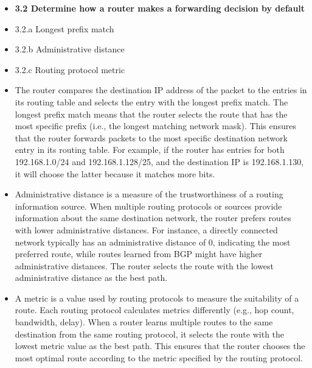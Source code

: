 \documentclass{article}
\begin{document}
\begin{itemize}
  \item \textbf{3.2 Determine how a router makes a forwarding decision by default}
  \item 3.2.a Longest prefix match
  \item 3.2.b Administrative distance
  \item 3.2.c Routing protocol metric
  	\item[] The router compares the destination IP address of the packet to the entries in its routing table and selects the entry with the longest prefix match. The longest prefix match means that the router selects the route that has the most specific prefix (i.e., the longest matching network mask). This ensures that the router forwards packets to the most specific destination network entry in its routing table. For example, if the router has entries for both 192.168.1.0/24 and 192.168.1.128/25, and the destination IP is 192.168.1.130, it will choose the latter because it matches more bits.
	\item[] Administrative distance is a measure of the trustworthiness of a routing information source. When multiple routing protocols or sources provide information about the same destination network, the router prefers routes with lower administrative distances. For instance, a directly connected network typically has an administrative distance of 0, indicating the most preferred route, while routes learned from BGP might have higher administrative distances. The router selects the route with the lowest administrative distance as the best path.
	\item[] A metric is a value used by routing protocols to measure the suitability of a route. Each routing protocol calculates metrics differently (e.g., hop count, bandwidth, delay). When a router learns multiple routes to the same destination from the same routing protocol, it selects the route with the lowest metric value as the best path. This ensures that the router chooses the most optimal route according to the metric specified by the routing protocol.
  

\end{itemize}
\end{document}
